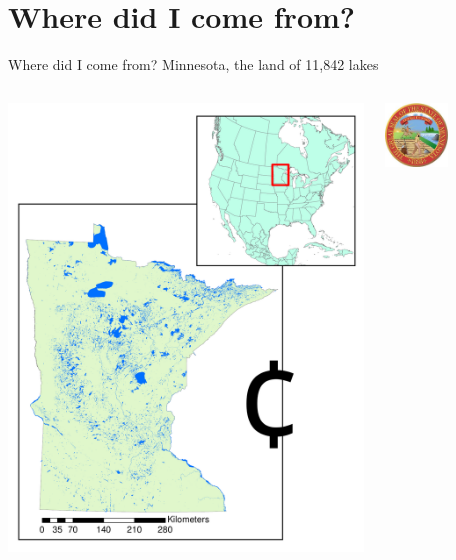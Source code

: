 \documentclass[serif]{beamer}\usepackage[]{graphicx}\usepackage[]{color}
\begin{document}
\section{Where did I come from?}

\begin{frame}{Where did I come from?}{}
Minnesota, the land of 11,842 lakes
\begin{columns}
\begin{column}{0.5\textwidth}
\centerline{\includegraphics[width=\textwidth]{fig/mn_lake_inset.pdf}}
\end{column}
\begin{column}{0.5\textwidth}
\begin{center}
\includegraphics[width=0.5\textwidth]{fig/mn_seal.jpg} \\~\\

\end{center}
\end{column}
\end{columns}
\end{frame}
\end{document}
